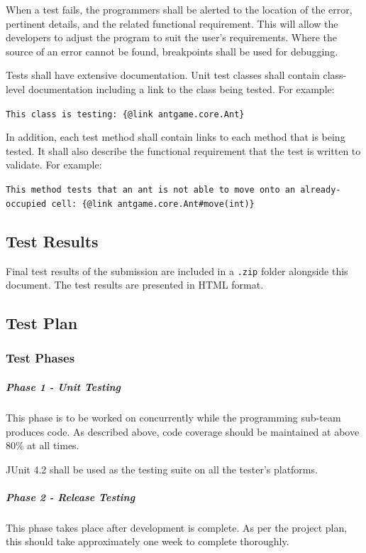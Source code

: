 \documentclass[11pt]{article}
\begin{document}
When a test fails, the programmers shall be alerted to the location of
the error, pertinent details, and the related functional requirement.
This will allow the developers to adjust the program to suit the user's
requirements. Where the source of an error cannot be found, breakpoints
shall be used for debugging.

Tests shall have extensive documentation. Unit test classes shall
contain class-level documentation including a link to the class being
tested. For example:

\texttt{This\ class\ is\ testing:\ \{@link\ antgame.core.Ant\}}

In addition, each test method shall contain links to each method that is
being tested. It shall also describe the functional requirement that the
test is written to validate. For example:

\texttt{This\ method\ tests\ that\ an\ ant\ is\ not\ able\ to\ move\ onto\ an\ already-occupied\ cell:\ \{@link\ antgame.core.Ant\#move(int)\}}

\subsection{Test Results}

Final test results of the submission are included in a \texttt{.zip} folder alongside this document. The test results are presented in HTML format. 

\subsection{Test Plan}\label{test-plan}

\subsubsection{Test Phases}\label{test-phases}

\subparagraph{Phase 1 - Unit Testing}\label{phase-1---unit-testing}

This phase is to be worked on concurrently while the programming
sub-team produces code. As described above, code coverage should be
maintained at above 80\% at all times.

JUnit 4.2 shall be used as the testing suite on all the tester's
platforms.

\subparagraph{Phase 2 - Release
Testing}\label{phase-2---release-testing}

This phase takes place after development is complete. As per the project
plan, this should take approximately one week to complete thoroughly.
\end{document}
